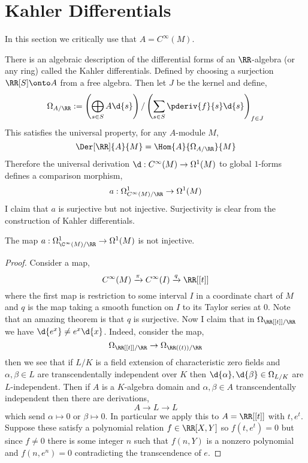 \documentclass[12pt]{article}
\begin{document}
\section{Kahler Differentials}

\begin{rmk}
In this section we critically use that $A = C^{\infty}(M)$.
\end{rmk}

There is an algebraic description of the differential forms of an $\RR$-algebra (or any ring) called the Kahler differentials. Defined by choosing a surjection $\RR[S] \onto A$ from a free algebra. Then let $J$ be the kernel and define,
\[ \Omega_{A/\RR} := \left( \bigoplus_{s \in S} A \d{s} \right) / \left( \sum_{s \in S} \pderiv{f}{s} \d{s} \right)_{f \in J} \]
This satisfies the universal property, for any $A$-module $M$,
\[ \Der[\RR]{A}{M} = \Hom{A}{\Omega_{A/\RR}}{M} \]
Therefore the universal derivation $\d : C^{\infty}(M) \to \Omega^1(M)$ to global $1$-forms defines a comparison morphism,
\[ a : \Omega^1_{C^{\infty}(M)/\RR} \to \Omega^1(M) \]
I claim that $a$ is surjective but not injective. Surjectivity is clear from the construction of Kahler differentials. 

\begin{prop}
The map $a : \Omega^1_{\C^{\infty}(M)/\RR} \to \Omega^1(M)$ is not injective.
\end{prop}

\begin{proof}
Consider a map,
\[ C^{\infty}(M) \xrightarrow{\pi} C^{\infty}(I) \xrightarrow{q} \RR[[t]] \] 
where the first map is restriction to some interval $I$ in a coordinate chart of $M$ and $q$ is the map taking a smooth function on $I$ to its Taylor series at $0$. Note that an amazing theorem is that $q$ is surjective. Now I claim that in $\Omega_{\RR[[t]]/\RR}$ we have $\d{e^x} \neq e^x \d{x}$. Indeed, consider the map,
\[ \Omega_{\RR[[t]]/\RR} \to \Omega_{\RR((t))/\RR} \]
then we see that if $L/K$ is a field extension of characteristic zero fields and $\alpha, \beta \in L$ are transcendentally independent over $K$ then $\d{\alpha}, \d{\beta} \in \Omega_{L/K}$ are $L$-independent. Then if $A$ is a $K$-algebra domain and $\alpha, \beta \in A$ transcendentally independent then there are derivations,
\[ A \to L \to L \]
which send $\alpha \mapsto 0$ or $\beta \mapsto 0$. In particular we apply this to $A = \RR[[t]]$ with $t, e^t$. Suppose these satisfy a polynomial relation $f \in \RR[X,Y]$ so $f(t, e^t) = 0$ but since $f \neq 0$ there is some integer $n$ such that $f(n, Y)$ is a nonzero polynomial and $f(n, e^n) = 0$ contradicting the transcendence of $e$.
\end{proof}
\end{document}
